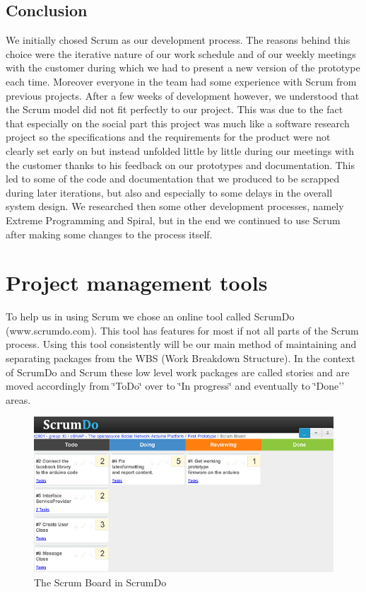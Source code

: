 \subsection{Conclusion}
We initially chosed Scrum as our development process. The reasons behind this choice were the iterative nature
of our work schedule and of our weekly meetings with the customer during which we had to present a new version
of the prototype each time. Moreover everyone in the team had some experience with Scrum from previous projects.
After a few weeks of development however, we understood that the Scrum model did not fit perfectly to our project.
This was due to the fact that especially on the social part this project was much like a software research project
so the specifications and the requirements for the product were not clearly set early on but instead unfolded little by
little during our meetings with the customer thanks to his feedback on our prototypes and documentation.
This led to some of the code and documentation that we produced to be scrapped during later iterations,
but also and especially to some delays in the overall system design. We researched then some other development processes,
namely Extreme Programming and Spiral, but in the end we continued to use Scrum after making some changes to the process itself.

\section{Project management tools}

To help us in using Scrum we chose an online tool called ScrumDo (www.scrumdo.com).
This tool has features for most if not all parts of the Scrum process. Using this tool
consistently will be our main method of maintaining and separating packages from
the WBS (Work Breakdown Structure). In the context of ScrumDo and
Scrum these low level work packages are called stories and are moved
accordingly from \char`\"{}ToDo\char`\"{} over to \char`\"{}In progress\char`\"{}
and eventually to \char`\"{}Done'' areas.
	
\begin{figure}[h!]
\centering \includegraphics{img/management-scrumdo} \caption{The Scrum Board in ScrumDo}
\label{fig:management-scrumdo}
\end{figure}


